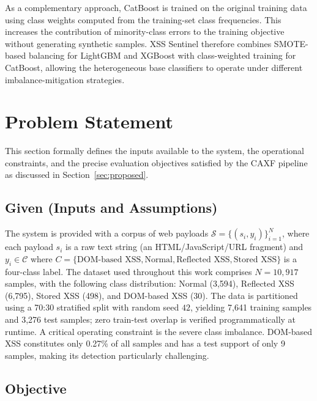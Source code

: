 \documentclass[11pt,a4paper]{article}
\begin{document}
As a complementary approach, CatBoost is trained on the original training
data using class weights computed from the training-set class frequencies.
This increases the contribution of minority-class errors to the training
objective without generating synthetic samples. XSS Sentinel therefore
combines SMOTE-based balancing for LightGBM and XGBoost with
class-weighted training for CatBoost, allowing the heterogeneous base
classifiers to operate under different imbalance-mitigation strategies.

\section{Problem Statement}
\label{sec:problem}

This section formally defines the inputs available to the system, the operational constraints, and the precise evaluation objectives satisfied by the CAXF pipeline as discussed in Section~\ref{sec:proposed}.

\subsection{Given (Inputs and Assumptions)}

The system is provided with a corpus of web payloads
$\mathcal{S} = \{(s_i, y_i)\}_{i=1}^{N}$, where each payload $s_i$ is a
raw text string (an HTML/JavaScript/URL fragment) and
$y_i \in \mathcal{C}$ where $C = \{\text{DOM-based XSS}, \text{Normal},
\text{Reflected XSS}, \text{Stored XSS}\}$ is a four-class label.
The dataset used throughout this work comprises $N = 10{,}917$ samples,
with the following class distribution: Normal (3,594), Reflected XSS
(6,795), Stored XSS (498), and DOM-based XSS (30). The data is
partitioned using a 70:30 stratified split with random seed $42$,
yielding 7,641 training samples and 3,276 test samples; zero train-test
overlap is verified programmatically at runtime. A critical operating
constraint is the severe class imbalance. DOM-based XSS constitutes
only 0.27\% of all samples and has a test support of only 9 samples,
making its detection particularly challenging.

\subsection{Objective}
\end{document}
